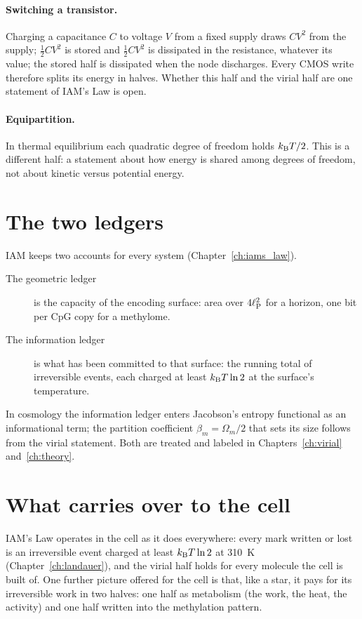 \paragraph{Switching a transistor.} Charging a capacitance $C$ to voltage $V$ from a fixed supply draws $CV^2$ from the supply; $\tfrac12CV^2$
is stored and $\tfrac12CV^2$ is dissipated in the resistance, whatever its value; the stored half is dissipated when the node discharges.
\derived{} Every CMOS write therefore splits its energy in halves. Whether this half and the virial half are one statement of IAM's Law is
open. \conjecture

\paragraph{Equipartition.} In thermal equilibrium each quadratic degree of freedom holds $k_{\mathrm B} T/2$.
This is a different half: a statement about how energy is shared among degrees of freedom, not about
kinetic versus potential energy.

\section{The two ledgers}

IAM keeps two accounts for every system (Chapter~\ref{ch:iams_law}).
\begin{description}
\item[The geometric ledger] is the capacity of the encoding surface: area over $4\ell_{\mathrm P}^2$ for a
      horizon, one bit per CpG copy for a methylome.
\item[The information ledger] is what has been committed to that surface: the running total of
      irreversible events, each charged at least $k_{\mathrm B} T\ln2$ at the surface's temperature.
\end{description}
In cosmology the information ledger enters Jacobson's entropy functional as an informational term; the partition
coefficient $\beta_m=\Omega_m/2$ that sets its size follows from the virial statement. Both are treated and labeled in
Chapters~\ref{ch:virial} and~\ref{ch:theory}. \conjecture

\section{What carries over to the cell}

IAM's Law operates in the cell as it does everywhere: every mark written or lost is an irreversible event charged at least
$k_{\mathrm B} T\ln2$ at 310~K (Chapter~\ref{ch:landauer}), and the virial half holds for every molecule the cell is built of. One further
picture offered for the cell is that, like a star, it pays for its irreversible work in two halves: one half as metabolism (the work,
the heat, the activity) and one half written into the methylation pattern.


